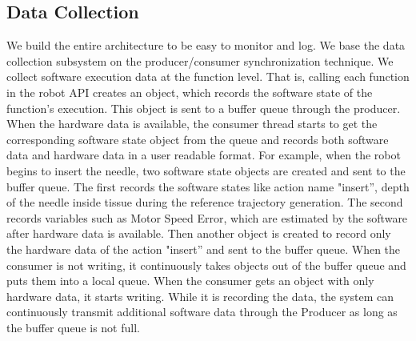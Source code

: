 \subsection{Data Collection}\label{subsec:datacollection}
We build the entire architecture to be easy to monitor and log. We base the data collection subsystem on the producer/consumer synchronization technique. We collect software execution data at the function level. That is, calling each function in the robot API creates an object, which records the software state of the function’s execution. This object is sent to a buffer queue through the producer. When the hardware data is available, the consumer thread starts to get the corresponding software state object from the queue and records both software data and hardware data in a user readable format. For example, when the robot begins to insert the needle, two software state objects are created and sent to the buffer queue. The first records the software states like action name "insert'', depth of the needle inside tissue during the reference trajectory generation. The second records variables such as Motor Speed Error, which are estimated by the software after hardware data is available. Then another object is created to record only the hardware data of the action "insert'' and sent to the buffer queue. When the consumer is not writing, it continuously takes objects out of the buffer queue and puts them into a local queue. When the consumer gets an object with only hardware data, it starts writing. While it is recording the data, the system can continuously transmit additional software data through the Producer as long as the buffer queue is not full.

